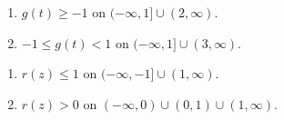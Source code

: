 \begin{multicols}{2}
\begin{enumerate}
\setcounter{enumi}{\value{HW}}

\item  $g(t) \geq -1$ on $(-\infty, 1] \cup (2, \infty)$.
\item  $-1 \leq g(t) < 1$ on $(-\infty, 1] \cup (3, \infty)$.

\setcounter{HW}{\value{enumi}}
\end{enumerate}
\end{multicols}

\begin{multicols}{2}
\begin{enumerate}
\setcounter{enumi}{\value{HW}}

\item  $r(z) \leq 1$ on $(-\infty, -1] \cup (1, \infty)$.

\item  $r(z) > 0$ on $(-\infty, 0) \cup (0,1) \cup (1, \infty)$.


\setcounter{HW}{\value{enumi}}
\end{enumerate}
\end{multicols}


